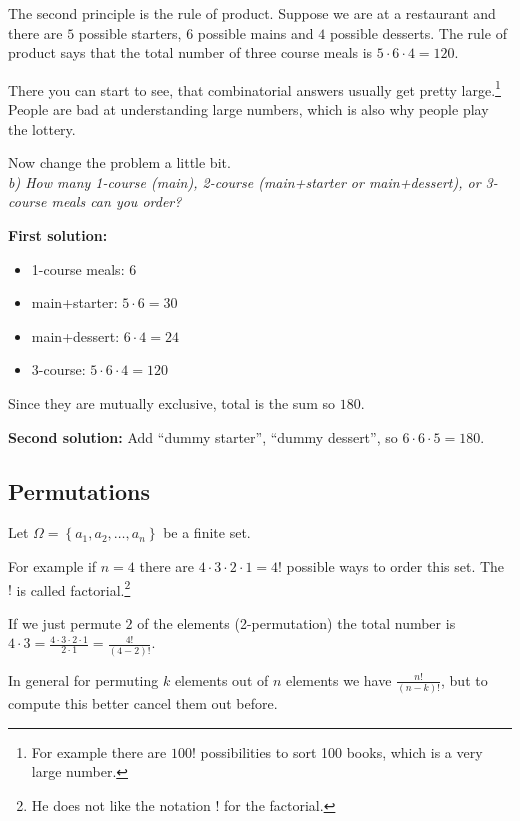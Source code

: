 \documentclass[english]{lbscript}
\begin{document}
The second principle is the rule of product. Suppose we are at a restaurant and there are \(5\) possible starters, \(6\) possible mains and \(4\) possible desserts. The rule of product says that  the total number of three course meals is \(5⋅6⋅4=120\).

There you can start to see, that combinatorial answers usually get pretty large.\footnote{For example there are \(100!\) possibilities to sort 100 books, which is a very large number.} People are bad at understanding large numbers, which is also why people play the lottery.

Now change the problem a little bit. \\
\emph{b) How many 1-course (main), 2-course (main+starter or main+dessert), or 3-course meals can you order?}

\textbf{First solution:}
\begin{itemize}
  \item 1-course meals: \(6\)
  \item main+starter: \(5⋅6=30\)
  \item main+dessert: \(6⋅4=24\)
  \item 3-course: \(5⋅6⋅4=120\)
\end{itemize}
Since they are mutually exclusive, total is the sum so \(180\).

\textbf{Second solution:}
Add ``dummy starter'', ``dummy dessert'', so \(6⋅6⋅5=180\).


\subsection{Permutations}
\label{sec:permutations}

Let \(𝛺=\left\{ a_1,a_2,\dots, a_n \right\} \) be a finite set.

For example if \(n=4\) there are \(4⋅3⋅2⋅1=4!\) possible ways to order this set. The \(!\) is called factorial.\footnote{He does not like the notation ! for the factorial.}

If we just permute \(2\) of the elements (2-permutation) the total number is \(4⋅3= \frac{4⋅3⋅2⋅1}{2⋅1}= \frac{4!}{(4-2)!}\).

In general for permuting \(k\) elements out of \(n\) elements we have \(\frac{n!}{(n-k)!}\), but to compute this better cancel them out before.
\end{document}
